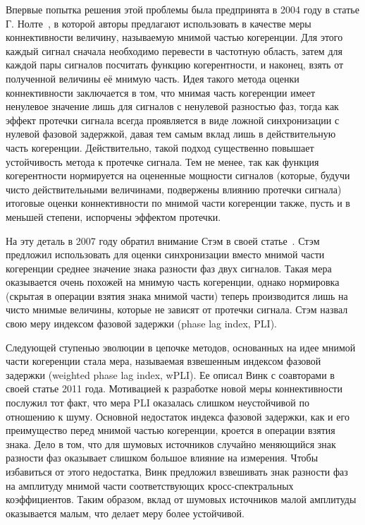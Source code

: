 Впервые попытка решения этой проблемы была предпринята в 2004 году в статье Г.
Нолте~\cite{imcoh}, в которой авторы предлагают использовать в качестве меры
коннективности величину, называемую мнимой частью когеренции.  Для этого каждый
сигнал сначала необходимо перевести в частотную область, затем для каждой пары
сигналов посчитать функцию когерентности, и наконец, взять от полученной
величины её мнимую часть.  Идея такого метода оценки коннективности заключается
в том, что мнимая часть когеренции имеет ненулевое значение лишь для сигналов с
ненулевой разностью фаз, тогда как эффект протечки сигнала всегда проявляется в
виде ложной синхронизации с нулевой фазовой задержкой, давая тем самым вклад
лишь в действительную часть когеренции. Действительно, такой подход существенно
повышает устойчивость метода к протечке сигнала. Тем не менее, так как функция
когерентности нормируется на оцененные мощности сигналов (которые, будучи чисто
действительными величинами, подвержены влиянию протечки сигнала) итоговые
оценки коннективности по мнимой части когеренции также, пусть и в меньшей
степени, испорчены эффектом протечки.

На эту деталь в 2007 году обратил внимание Стэм в своей статье~\cite{PLI}.
Стэм предложил использовать для оценки синхронизации
вместо мнимой части когеренции среднее значение знака разности фаз двух сигналов.
Такая мера оказывается очень похожей на мнимую часть когеренции, однако нормировка
(скрытая в операции взятия знака мнимой части) теперь производится лишь на чисто мнимые величины, которые не
зависят от протечки сигнала. Стэм назвал свою меру индексом фазовой задержки (phase lag index, PLI).

Следующей ступенью эволюции в цепочке методов, основанных на идее мнимой части когеренции стала
мера, называемая взвешенным индексом фазовой задержки (weighted phase lag index, wPLI). Ее описал Винк с
соавторами в своей статье 2011 года. Мотивацией к разработке новой меры коннективности послужил тот
факт, что мера PLI оказалась слишком неустойчивой по отношению к шуму. Основной недостаток индекса фазовой
задержки, как и его преимущество перед мнимой частью когеренции, кроется в операции взятия знака.
Дело в том, что для шумовых источников случайно меняющийся знак разности фаз оказывает слишком большое
влияние на измерения. Чтобы избавиться от этого недостатка, Винк предложил взвешивать знак разности фаз
на амплитуду мнимой части соответствующих кросс-спектральных коэффициентов. Таким образом, вклад от шумовых
источников малой амплитуды оказывается малым, что делает меру более устойчивой.

